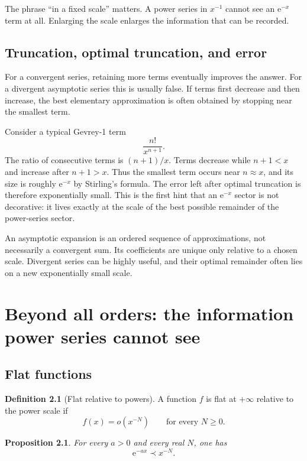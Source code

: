 \documentclass[11pt,oneside]{book}
\newtheorem{proposition}[theorem]{Proposition}
\theoremstyle{definition}
\newtheorem{definition}[theorem]{Definition}
\theoremstyle{remark}
\newcommand{\e}{\mathrm{e}}
\newcommand{\smallo}{o}
\newcommand{\precdom}{\prec}
\begin{document}
The phrase ``in a fixed scale'' matters. A power series in $x^{-1}$ cannot see an
$\e^{-x}$ term at all. Enlarging the scale enlarges the information that can be
recorded.

\section{Truncation, optimal truncation, and error}

For a convergent series, retaining more terms eventually improves the answer.
For a divergent asymptotic series this is usually false. If terms first decrease
and then increase, the best elementary approximation is often obtained by
stopping near the smallest term.

Consider a typical Gevrey-1 term
\[
  \frac{n!}{x^{n+1}}.
\]
The ratio of consecutive terms is $(n+1)/x$. Terms decrease while $n+1<x$ and
increase after $n+1>x$. Thus the smallest term occurs near $n\approx x$, and its
size is roughly $\e^{-x}$ by Stirling's formula. The error left after optimal
truncation is therefore exponentially small. This is the first hint that an
$\e^{-x}$ sector is not decorative: it lives exactly at the scale of the best
possible remainder of the power-series sector.

\begin{summarybox}
An asymptotic expansion is an ordered sequence of approximations, not
necessarily a convergent sum. Its coefficients are unique only relative to a
chosen scale. Divergent series can be highly useful, and their optimal remainder
often lies on a new exponentially small scale.
\end{summarybox}

\chapter{Beyond all orders: the information power series cannot see}
\label{ch:beyond-all-orders}

\section{Flat functions}

\begin{definition}[Flat relative to powers]
A function $f$ is flat at $+\infty$ relative to the power scale if
\[
  f(x)=\smallo(x^{-N})
  \qquad\text{for every }N\ge0.
\]
\end{definition}

\begin{proposition}
For every $a>0$ and every real $N$, one has
\[
  \e^{-ax}\precdom x^{-N}.
\]
\end{proposition}
\end{document}
